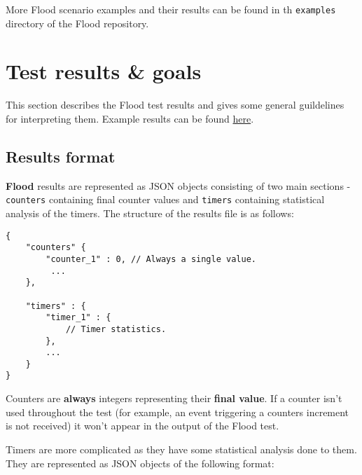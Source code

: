 \documentclass[a4paper]{article}
\begin{document}
More Flood scenario examples and their results can be found in th \texttt{examples} directory of the Flood repository.

\pagebreak
\section{Test results \& goals}
\label{sec-4}
\label{ref-results}

This section describes the Flood test results and gives some general guildelines for interpreting them. Example results can be found \hyperref[sec-4-4]{here}.
\subsection{Results format}
\label{sec-4-1}

\textbf{Flood} results are represented as JSON objects consisting of two main sections - \texttt{counters} containing final counter values and \texttt{timers} containing statistical analysis of the timers. The structure of the results file is as follows:


\begin{verbatim}
{
    "counters" {
        "counter_1" : 0, // Always a single value.
         ...
    },

    "timers" : {
        "timer_1" : {
            // Timer statistics.
        },
        ...
    }
}
\end{verbatim}




\noindent
Counters are \textbf{always} integers representing their \textbf{final value}. If a counter isn't used throughout the test (for example, an event triggering a counters increment is not received) it won't appear in the output of the Flood test.

\noindent
Timers are more complicated as they have some statistical analysis done to them. They are represented as JSON objects of the following format:
\end{document}
